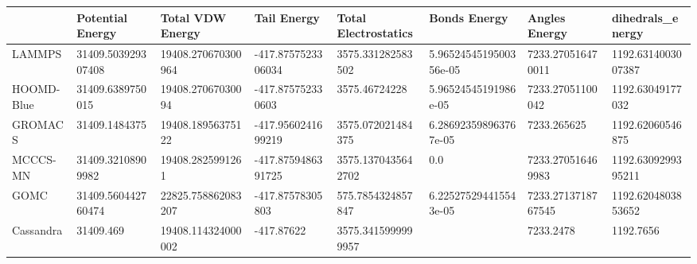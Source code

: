 \begin{table}[!ht]
    \centering
    \begin{tabular}{|l|l|l|l|l|l|l|l|}
    \hline
        ~ & Potential Energy & Total VDW Energy & Tail Energy & Total Electrostatics  & Bonds Energy & Angles Energy & dihedrals\_energy \\ \hline
        LAMMPS & 31409.503929307408 & 19408.270670300964 & -417.8757523306034 & 3575.331282583502 & 5.9652454519500356e-05 & 7233.270516470011 & 1192.6314003007387 \\ \hline
        HOOMD-Blue & 31409.6389750015 & 19408.27067030094 & -417.875752330603 & 3575.46724228 & 5.96524545191986e-05 & 7233.27051100042 & 1192.63049177032 \\ \hline
        GROMACS & 31409.1484375 & 19408.18956375122 & -417.9560241699219 & 3575.072021484375 & 6.286923598963767e-05 & 7233.265625 & 1192.62060546875 \\ \hline
        MCCCS-MN & 31409.32108909982 & 19408.2825991261 & -417.8759486391725 & 3575.1370435642702 & 0.0 & 7233.270516469983 & 1192.6309299395211 \\ \hline
        GOMC & 31409.560442760474 & 22825.758862083207 & -417.87578305803 & 575.7854324857847 & 6.225275294415543e-05 & 7233.2713718767545 & 1192.6204803853652 \\ \hline
        Cassandra & 31409.469 & 19408.114324000002 & -417.87622 & 3575.3415999999957 & ~ & 7233.2478 & 1192.7656 \\ \hline
    \end{tabular}
\end{table}
